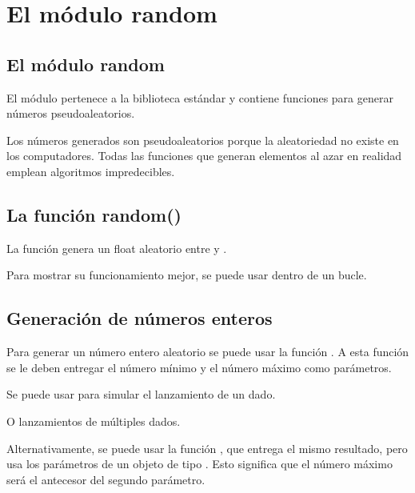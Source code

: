 \chapter{El módulo random}

\section{El módulo random}

El módulo  pertenece a la biblioteca estándar y contiene funciones para generar números pseudoaleatorios.


Los números generados son pseudoaleatorios porque la aleatoriedad  no existe en los computadores. Todas las funciones que generan elementos al azar en realidad emplean algoritmos impredecibles.\smallskip

\section{La función random()}

La función  genera un float aleatorio entre  y .


Para mostrar su funcionamiento mejor, se puede usar dentro de un bucle.



\section{Generación de números enteros}

Para generar un número entero aleatorio se puede usar la función . A esta función se le deben entregar el número mínimo y el número máximo como parámetros.\smallskip

Se puede usar para simular el lanzamiento de un dado.


O lanzamientos de múltiples dados.


Alternativamente, se puede usar la función , que entrega el mismo resultado, pero usa los parámetros de un objeto de tipo . Esto significa que el número máximo será el antecesor del segundo parámetro.

